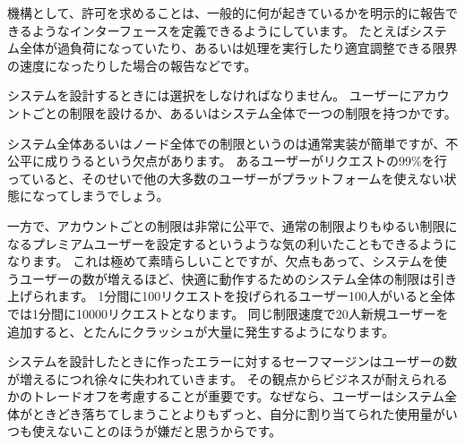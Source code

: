 機構として、許可を求めることは、一般的に何が起きているかを明示的に報告できるようなインターフェースを定義できるようにしています。
たとえばシステム全体が過負荷になっていたり、あるいは処理を実行したり適宜調整できる限界の速度になったりした場合の報告などです。

システムを設計するときには選択をしなければなりません。
ユーザーにアカウントごとの制限を設けるか、あるいはシステム全体で一つの制限を持つかです。

システム全体あるいはノード全体での制限というのは通常実装が簡単ですが、不公平に成りうるという欠点があります。
あるユーザーがリクエストの99\%を行っていると、そのせいで他の大多数のユーザーがプラットフォームを使えない状態になってしまうでしょう。

一方で、アカウントごとの制限は非常に公平で、通常の制限よりもゆるい制限になるプレミアムユーザーを設定するというような気の利いたこともできるようになります。
これは極めて素晴らしいことですが、欠点もあって、システムを使うユーザーの数が増えるほど、快適に動作するためのシステム全体の制限は引き上げられます。
1分間に100リクエストを投げられるユーザー100人がいると全体では1分間に10000リクエストとなります。
同じ制限速度で20人新規ユーザーを追加すると、とたんにクラッシュが大量に発生するようになります。

システムを設計したときに作ったエラーに対するセーフマージンはユーザーの数が増えるにつれ徐々に失われていきます。
その観点からビジネスが耐えられるかのトレードオフを考慮することが重要です。なぜなら、ユーザーはシステム全体がときどき落ちてしまうことよりもずっと、自分に割り当てられた使用量がいつも使えないことのほうが嫌だと思うからです。

